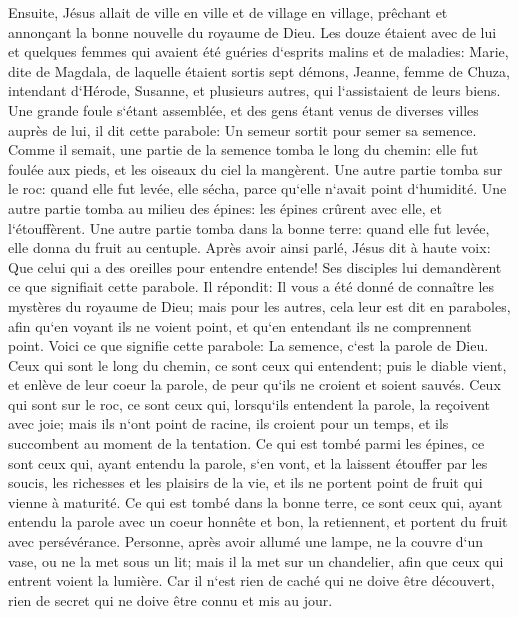\verse Ensuite, Jésus allait de ville en ville et de village en village, prêchant et annonçant la bonne nouvelle du royaume de Dieu. 
\verse Les douze étaient avec de lui et quelques femmes qui avaient été guéries d`esprits malins et de maladies: Marie, dite de Magdala, de laquelle étaient sortis sept démons, 
\verse Jeanne, femme de Chuza, intendant d`Hérode, Susanne, et plusieurs autres, qui l`assistaient de leurs biens. 
\verse Une grande foule s`étant assemblée, et des gens étant venus de diverses villes auprès de lui, il dit cette parabole: 
\verse Un semeur sortit pour semer sa semence. Comme il semait, une partie de la semence tomba le long du chemin: elle fut foulée aux pieds, et les oiseaux du ciel la mangèrent. 
\verse Une autre partie tomba sur le roc: quand elle fut levée, elle sécha, parce qu`elle n`avait point d`humidité. 
\verse Une autre partie tomba au milieu des épines: les épines crûrent avec elle, et l`étouffèrent. 
\verse Une autre partie tomba dans la bonne terre: quand elle fut levée, elle donna du fruit au centuple. Après avoir ainsi parlé, Jésus dit à haute voix: Que celui qui a des oreilles pour entendre entende! 
\verse Ses disciples lui demandèrent ce que signifiait cette parabole. 
\verse Il répondit: Il vous a été donné de connaître les mystères du royaume de Dieu; mais pour les autres, cela leur est dit en paraboles, afin qu`en voyant ils ne voient point, et qu`en entendant ils ne comprennent point. 
\verse Voici ce que signifie cette parabole: La semence, c`est la parole de Dieu. 
\verse Ceux qui sont le long du chemin, ce sont ceux qui entendent; puis le diable vient, et enlève de leur coeur la parole, de peur qu`ils ne croient et soient sauvés. 
\verse Ceux qui sont sur le roc, ce sont ceux qui, lorsqu`ils entendent la parole, la reçoivent avec joie; mais ils n`ont point de racine, ils croient pour un temps, et ils succombent au moment de la tentation. 
\verse Ce qui est tombé parmi les épines, ce sont ceux qui, ayant entendu la parole, s`en vont, et la laissent étouffer par les soucis, les richesses et les plaisirs de la vie, et ils ne portent point de fruit qui vienne à maturité. 
\verse Ce qui est tombé dans la bonne terre, ce sont ceux qui, ayant entendu la parole avec un coeur honnête et bon, la retiennent, et portent du fruit avec persévérance. 
\verse Personne, après avoir allumé une lampe, ne la couvre d`un vase, ou ne la met sous un lit; mais il la met sur un chandelier, afin que ceux qui entrent voient la lumière. 
\verse Car il n`est rien de caché qui ne doive être découvert, rien de secret qui ne doive être connu et mis au jour. 
